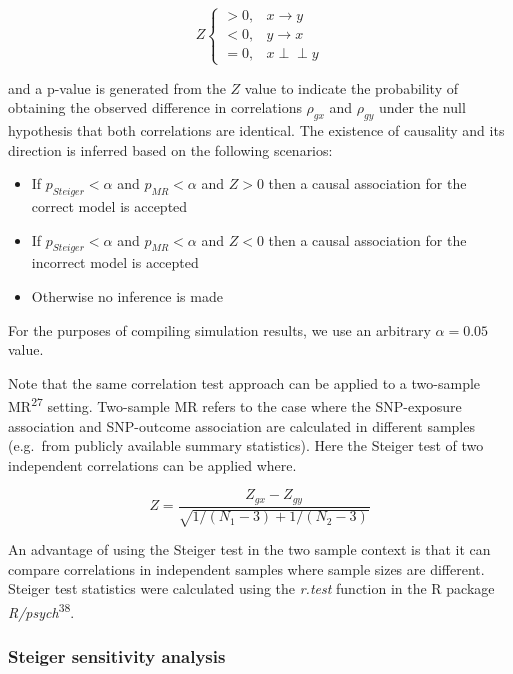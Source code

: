 \documentclass[]{article}
\providecommand{\tightlist}{%
  \setlength{\itemsep}{0pt}\setlength{\parskip}{0pt}}
\begin{document}
\[
Z \left\{
\begin{array}{ll}
> 0, & x \to y\\
< 0, & y \to x\\
= 0, & x \perp\!\!\!\perp y 
\end{array} \right.
\]

and a p-value is generated from the \(Z\) value to indicate the
probability of obtaining the observed difference in correlations
\(\rho_{gx}\) and \(\rho_{gy}\) under the null hypothesis that both
correlations are identical. The existence of causality and its direction
is inferred based on the following scenarios:

\begin{itemize}
\tightlist
\item
  If \(p_{Steiger} < \alpha\) and \(p_{MR} < \alpha\) and \(Z > 0\) then
  a causal association for the correct model is accepted
\item
  If \(p_{Steiger} < \alpha\) and \(p_{MR} < \alpha\) and \(Z < 0\) then
  a causal association for the incorrect model is accepted
\item
  Otherwise no inference is made
\end{itemize}

For the purposes of compiling simulation results, we use an arbitrary
\(\alpha = 0.05\) value.

Note that the same correlation test approach can be applied to a
two-sample MR\textsuperscript{27} setting. Two-sample MR refers to the
case where the SNP-exposure association and SNP-outcome association are
calculated in different samples (e.g.~from publicly available summary
statistics). Here the Steiger test of two independent correlations can
be applied where.

\[
Z = \frac{Z_{gx} - Z_{gy}} { \sqrt{ 1 / (N_{1} - 3) + 1 / (N_{2} - 3) } }
\]

An advantage of using the Steiger test in the two sample context is that
it can compare correlations in independent samples where sample sizes
are different. Steiger test statistics were calculated using the
\emph{r.test} function in the R package
\emph{R/psych}\textsuperscript{38}.

\subsubsection{Steiger sensitivity
analysis}\label{steiger-sensitivity-analysis}
\end{document}
